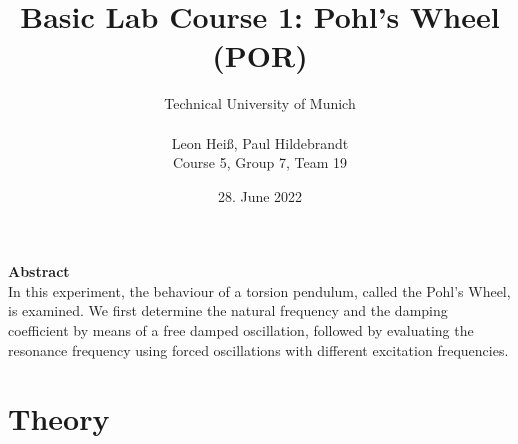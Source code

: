 \documentclass{article}
\title{Basic Lab Course 1: Pohl's Wheel (POR)}
\author{Technical University of Munich\\\\Leon Heiß, Paul Hildebrandt \\
Course 5, Group 7, Team 19}
\date{28. June 2022}
\begin{document}
\maketitle
\large
\begin{center}
\textbf{Abstract}\\
\normalsize
\medskip
In this experiment, the behaviour of a torsion pendulum, called the Pohl's Wheel, is examined. We first determine the natural frequency and the damping coefficient by means of a free damped oscillation, followed by evaluating the resonance frequency using forced oscillations with different excitation frequencies.
\end{center}
\normalsize
\tableofcontents
\newpage
\section{Theory}
\end{document}

